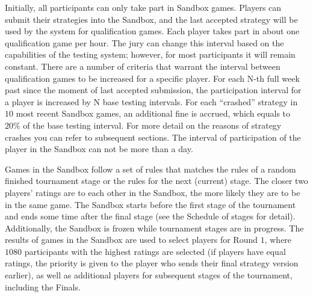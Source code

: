 Initially, all participants can only take part in Sandbox games. Players can submit their strategies into the Sandbox, and the last accepted
strategy will be used by the system for qualification games. Each player takes part in about one qualification game per hour. The jury can
change this interval based on the capabilities of the testing system; however, for most participants it will remain constant. There are a
number of criteria that warrant the interval between qualification games to be increased for a specific player. For each N-th full week past
since the moment of last accepted submission, the participation interval for a player is increased by N base testing intervals. For each
``crashed'' strategy in $10$ most recent Sandbox games, an additional fine is accrued, which equals to $20\%$ of the base testing interval.
For more detail on the reasons of strategy crashes you can refer to subsequent sections. The interval of participation of the player in the
Sandbox can not be more than a day.

Games in the Sandbox follow a set of rules that matches the rules of a random finished tournament stage or the rules for the next
(current) stage. The closer two players’ ratings are to each other in the Sandbox, the more likely they are to be in
the same game. The Sandbox starts before the first stage of the tournament and ends some time after the final stage (see the Schedule
of stages for detail). Additionally, the Sandbox is frozen while tournament stages are in progress. The results of games in the Sandbox
are used to select players for Round $1$, where $1080$ participants with the highest ratings are selected (if players have equal ratings, the priority is given
to the player who sends their final strategy version earlier), as well as additional players for subsequent stages of the tournament, including the Finals.

